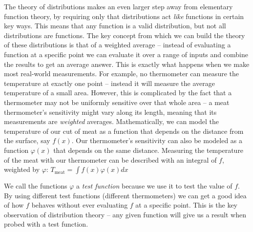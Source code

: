   The theory of distributions makes an even larger step away from elementary function theory, by requiring only that distributions act \emph{like} functions in certain key ways.
  This means that any function is a valid distribution, but not all distributions are functions.
  The key concept from which we can build the theory of these distributions is that of a weighted average -- instead of evaluating a function at a specific point we can evaluate it over a range of inputs and combine the results to get an average answer.
  This is exactly what happens when we make most real-world measurements.
  For example, no thermometer can measure the temperature at exactly one point -- instead it will measure the average temperature of a small area.
  However, this is complicated by the fact that a thermometer may not be uniformly sensitive over that whole area -- a meat thermometer's sensitivity might vary along its length, meaning that its measurements are \emph{weighted} averages. 
  Mathematically, we can model the temperature of our cut of meat as a function that depends on the distance from the surface, say $f(x)$.
  Our thermometer's sensitivity can also be modeled as a function $\varphi(x)$ that depends on the same distance.
  Measuring the temperature of the meat with our thermometer can be described with an integral of $f$, weighted by $\varphi$: $T_\text{meat} = \int f(x)\varphi(x) dx$ %

  We call the functions $\varphi$ a \emph{test function} because we use it to test the value of $f$.
  By using different test functions (different thermometers) we can get a good idea of how $f$ behaves without ever evaluating $f$ at a specific point.
  This is the key observation of distribution theory -- any given function will give us a result when probed with a test function.
